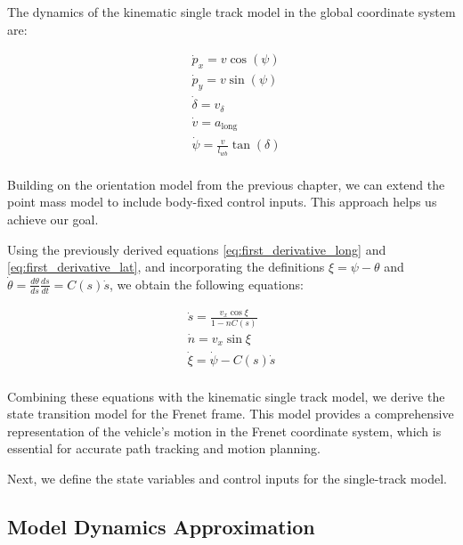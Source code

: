 The dynamics of the kinematic single track model in the global coordinate system are:

\begin{align*}
	 & \dot{p}_x = v\cos(\psi)                    \\
	 & \dot{p}_y = v\sin(\psi)                    \\
	 & \dot{\delta} = v_{\delta}                  \\
	 & \dot{v} = a_{\text{long}}                  \\
	 & \dot{\psi} = \frac{v}{l_{wb}} \tan(\delta) \\
\end{align*}

Building on the orientation model from the previous chapter, we can extend the point mass model to include body-fixed control inputs.
This approach helps us achieve our goal.

Using the previously derived equations \ref{eq:first_derivative_long} and \ref{eq:first_derivative_lat}, and incorporating the
definitions $\xi = \psi - \theta$ and $\dot{\theta}=\frac{d\theta}{ds}\frac{ds}{dt}=C(s)\dot{s}$, we obtain
the following equations:

\begin{align*}
	\dot{s} = \frac{v_x\cos{\xi}}{1-nC(s)} \\
	\dot{n} = v_x\sin{\xi}                 \\
	\dot{\xi} = \dot{\psi} - C(s)\dot{s}   \\
\end{align*}

Combining these equations with the kinematic single track model, we derive the state transition model for the Frenet frame.
This model provides a comprehensive representation of the vehicle's motion in the Frenet coordinate system, which is essential for accurate path
tracking and motion planning.

Next, we define the state variables and control inputs for the single-track model.

\subsection{Model Dynamics Approximation} \label{subsec:approximation_of_model_dynamics}

